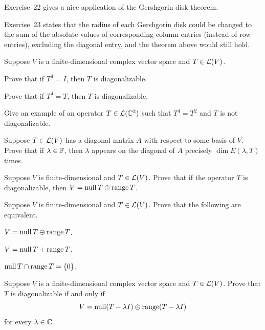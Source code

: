%
Exercise~22 gives a nice application of the Gershgorin disk theorem.

Exercise~23 states that the radius of each Gershgorin disk could be changed to
the sum of the absolute values of corresponding column entries (instead of row
entries), excluding the diagonal entry, and the theorem above would still hold.

\begin{exc}

\begin{exercise}
Suppose $V$ is a finite-dimensional complex vector space and $T\in\mathcal{L}(V)$.
\begin{parts}
\item Prove that if $T^4=I$, then $T$ is diagonalizable.
\item Prove that if $T^4=T$, then $T$ is diagonalizable.
\item Give an example of an operator $T\in\mathcal{L}(\mathbb{C}^2)$ such that $T^4=T^2$ and
  $T$ is not diagonalizable.
\end{parts}
\end{exercise}

\begin{exercise}
Suppose $T\in\mathcal{L}(V)$ has a diagonal matrix $A$ with respect to some basis of
$V$. Prove that if $\lambda\in\mathbb{F}$, then $\lambda$ appears on the diagonal of $A$
precisely $\dim E(\lambda,T)$ times.
\end{exercise}

\begin{exercise}
Suppose $V$ is finite-dimensional and $T\in\mathcal{L}(V)$. Prove that if the operator
$T$ is diagonalizable, then $V=\operatorname{null} T\oplus\operatorname{range} T$.
\end{exercise}

\begin{exercise}
Suppose $V$ is finite-dimensional and $T\in\mathcal{L}(V)$. Prove that the following
are equivalent.
\begin{parts}
\item $V=\operatorname{null} T\oplus\operatorname{range} T$.
\item $V=\operatorname{null} T+\operatorname{range} T$.
\item $\operatorname{null} T\cap\operatorname{range} T=\{0\}$.
\end{parts}
\end{exercise}

\begin{exercise}
Suppose $V$ is a finite-dimensional complex vector space and $T\in\mathcal{L}(V)$.
Prove that $T$ is diagonalizable if and only if
\[ V=\operatorname{null}(T-\lambda I)\oplus\operatorname{range}(T-\lambda I) \]
for every $\lambda\in\mathbb{C}$.
\end{exercise}


\end{exc}

